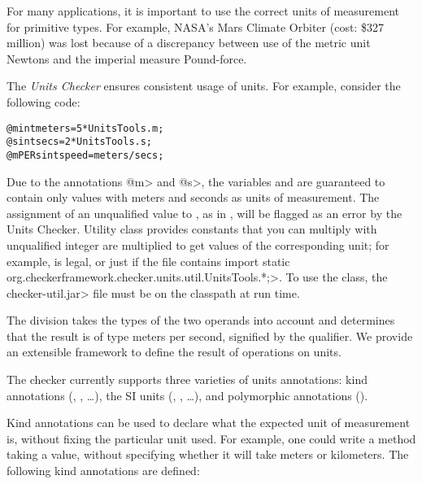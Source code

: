 \htmlhr
{}

For many applications, it is important to use the correct units of
measurement for primitive types.  For example, NASA's Mars Climate Orbiter
(cost: \$327 million) was lost because of a discrepancy between use
of the metric unit Newtons and the imperial measure Pound-force.

The \emph{Units Checker} ensures consistent usage of units.
For example, consider the following code:

\begin{alltt}
@m int meters = 5 * UnitsTools.m;
@s int secs = 2 * UnitsTools.s;
@mPERs int speed = meters / secs;
\end{alltt}

Due to the annotations \<@m> and \<@s>, the variables  and  are guaranteed to contain
only values with meters and seconds as units of measurement.
The assignment of an unqualified value to , as in
, will be flagged as an error by the Units Checker.
Utility class  provides constants
that you can multiply with unqualified integer are multiplied to get values
of the corresponding unit; for example,  is legal, or just  if the file contains
\<import static org.checkerframework.checker.units.util.UnitsTools.*;>.
To use the  class, the
\<checker-util.jar> file must be on the classpath at run time.

The division  takes the types of the two operands
into account and determines that the result is of type
meters per second, signified by the  qualifier.
We provide an extensible framework to define the result of operations
on units.



The checker currently supports three varieties of units annotations:
kind annotations (,
, \dots),
the SI units (, , \dots), and polymorphic annotations
().


Kind annotations can be used to declare what the expected unit of
measurement is, without fixing the particular unit used.
For example, one could write a method taking a  value,
without specifying whether it will take meters or kilometers.
The following kind annotations are defined:

